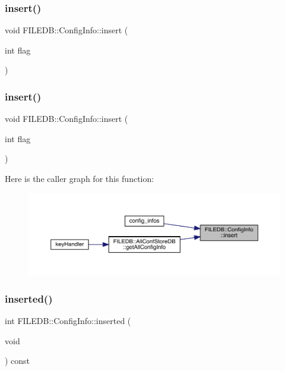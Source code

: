 \subsubsection{\texorpdfstring{insert()}{insert()}\hspace{0.1cm}{\footnotesize\ttfamily [2/3]}}
{\footnotesize\ttfamily void F\+I\+L\+E\+D\+B\+::\+Config\+Info\+::insert (\begin{DoxyParamCaption}\item[{int}]{flag }\end{DoxyParamCaption})}

\mbox{\label{classFILEDB_1_1ConfigInfo_a59ae164a1b55687a88e37d876c4f05f6}} 
\subsubsection{\texorpdfstring{insert()}{insert()}\hspace{0.1cm}{\footnotesize\ttfamily [3/3]}}
{\footnotesize\ttfamily void F\+I\+L\+E\+D\+B\+::\+Config\+Info\+::insert (\begin{DoxyParamCaption}\item[{int}]{flag }\end{DoxyParamCaption})}

Here is the caller graph for this function\+:
\nopagebreak
\begin{figure}[H]
\begin{center}
\leavevmode
\includegraphics[width=350pt]{d0/d90/classFILEDB_1_1ConfigInfo_a59ae164a1b55687a88e37d876c4f05f6_icgraph}
\end{center}
\end{figure}
\mbox{\label{classFILEDB_1_1ConfigInfo_a45cc2aa85de0ccd89c06989bb9cff843}} 
\subsubsection{\texorpdfstring{inserted()}{inserted()}\hspace{0.1cm}{\footnotesize\ttfamily [1/3]}}
{\footnotesize\ttfamily int F\+I\+L\+E\+D\+B\+::\+Config\+Info\+::inserted (\begin{DoxyParamCaption}\item[{void}]{ }\end{DoxyParamCaption}) const}

